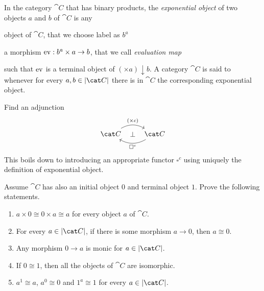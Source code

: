 \begin{exercise}
In the category \(\cat C\) that has binary products, the {\em exponential object} of two objects \(a\) and \(b\) of  \(\cat C\) is any
\begin{tcbitem}
\item object of \(\cat C\), that we choose label as \(b^a\)
\item a morphism \(\operatorname{ev} : b^a \times a \to b\), that we call {\em evaluation map}
\end{tcbitem}
such that \(\operatorname{ev}\) is a terminal object of \((\times a) \downarrow b\). A category \(\cat C\) is said to  whenever for every \(a, b \in \obj{\cat C}\) there is in \(\cat C\) the corresponding exponential object.

\begin{tcbenum}
\item Find an adjunction
\[\begin{tikzcd}
\cat C \ar["{(\times c)}"{name=L}, r, bend left] & \cat C \ar["{\square^c}"{name=R}, l, bend left]
\ar["\perp"{description}, phantom, from=L, to=R]
\end{tikzcd}\]
This boils down to introducing an appropriate functor \(\square^c\) using uniquely the definition of exponential object.
\item Assume \(\cat C\) has also an initial object \(0\) and terminal object \(1\). Prove the following statements.
\begin{enumerate}[leftmargin=*,label=(\roman*)]
\item \(a \times 0 \cong 0 \times a \cong a\) for every object \(a\) of \(\cat C\).
\item For every \(a \in \obj{\cat C}\), if there is some morphism \(a \to 0\), then \(a \cong 0\).
\item Any morphism \(0 \to a\) is monic for \(a \in \obj{\cat C}\).
\item If \(0 \cong 1\), then all the objects of \(\cat C\) are isomorphic.
\item \(a^1 \cong a\), \(a^0 \cong 0\) and \(1^a \cong 1\) for every \(a \in \obj{\cat C}\).
\end{enumerate}
\end{tcbenum}

\end{exercise}
